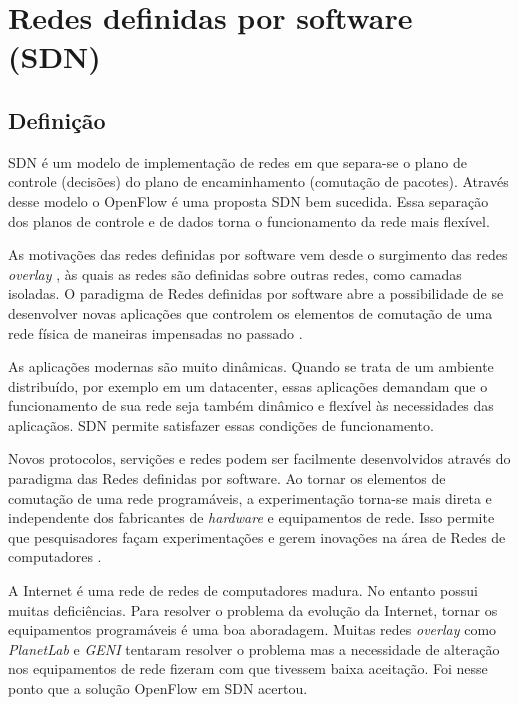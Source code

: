 \section{Redes definidas por software (SDN)}


\subsection{Definição}
SDN é um modelo de implementação de redes em que separa-se o plano de controle
(decisões) do plano de encaminhamento (comutação de pacotes). 
Através desse modelo o OpenFlow \citep{nick2008openflow} é uma proposta SDN 
bem sucedida. 
Essa separação dos planos de controle e de dados torna o funcionamento da
rede mais flexível.

As motivações das redes definidas por software vem desde o surgimento das 
redes \emph{overlay} \citep{clark2006overlay}, às quais as redes são definidas
sobre outras redes, como camadas isoladas.
O paradigma de Redes definidas por software abre a possibilidade de se 
desenvolver novas aplicações que controlem os elementos de comutação de uma
rede física de maneiras impensadas no passado \citep{guedes2012redes}.

As aplicações modernas são muito dinâmicas. 
Quando se trata de um ambiente distribuído, por exemplo em um datacenter, 
essas aplicações demandam que o funcionamento de sua rede seja também 
dinâmico e flexível às necessidades das aplicaçãos. 
SDN permite satisfazer essas condições de funcionamento. 

Novos protocolos, servições e redes podem ser facilmente desenvolvidos através
do paradigma das Redes definidas por software.
Ao tornar os elementos de comutação de uma rede programáveis, a 
experimentação torna-se mais direta e independente dos fabricantes de 
\emph{hardware} e equipamentos de rede. 
Isso permite que pesquisadores façam experimentações e gerem inovações 
na área de Redes de computadores \citep{nick2008openflow}.

A Internet é uma rede de redes de computadores madura. 
No entanto possui muitas deficiências. 
Para resolver o problema da evolução da Internet, tornar os equipamentos 
programáveis é uma boa aboradagem.
Muitas redes \emph{overlay} como \emph{PlanetLab} 
\citep{peterson2006experiences} e \emph{GENI} \citep{berman2014geni} tentaram
resolver o problema mas a necessidade de alteração nos equipamentos de rede
fizeram com que tivessem baixa aceitação.
Foi nesse ponto que a solução OpenFlow em SDN acertou.


